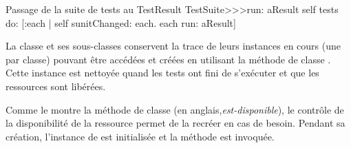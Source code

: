 \documentclass[a4paper,10pt,twoside]{book}
\begin{document}
{%
\begin{method}[testsuiterun:]{Passage de la suite de tests au TestResult}
TestSuite>>>run: aResult
	self tests do:
			[:each |
			self sunitChanged: each.
			each run: aResult]
\end{method}
La classe  et ses sous-classes conservent la trace de leurs instances en cours (une par classe) pouvant être accédées et créées en utilisant la méthode de classe . Cette instance est nettoyée quand les tests ont fini de s'exécuter et que les ressources sont libérées.

Comme le montre la méthode de classe  (en anglais,\emph{est-disponible}), le contrôle de la disponibilité de la ressource permet de la recréer en cas de besoin. 
Pendant sa création, l'instance de  est initialisée et la méthode  est invoquée.


}
\end{document}
